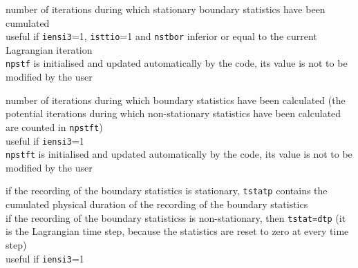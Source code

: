 {number of iterations during which stationary boundary statistics have
been cumulated\\
useful if \texttt{iensi3}=1, \texttt{isttio}=1 and \texttt{nstbor} inferior
or equal to the current Lagrangian iteration\\
\texttt{npstf} is initialised and updated automatically by the code,
its value is not to be modified by the user}

{number of iterations during which boundary statistics have
been calculated
(the potential iterations during which non-stationary
statistics have been calculated are counted in \texttt{npstft})\\
useful if \texttt{iensi3}=1\\
\texttt{npstft} is initialised and updated automatically by the code,
its value is not to be modified by the user}

{if the recording of the boundary statistics is stationary, \texttt{tstatp}
contains the cumulated physical duration of the recording of the boundary
statistics\\
if the recording of the boundary statisticss is non-stationary, then
\texttt{tstat=dtp} (it is the Lagrangian time step, because the
statistics are reset to zero at every time step)\\
useful if \texttt{iensi3}=1}
